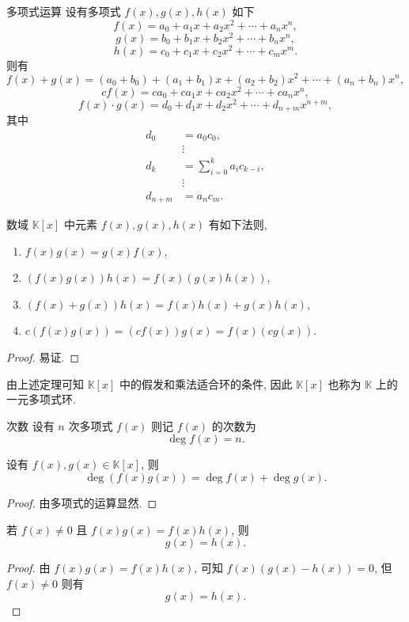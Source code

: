 \documentclass[cn,toc=twocol]{elegantbook}
\newcommand{\ITEMS}{\begin{enumerate}}
\newcommand{\ITEME}{\end{enumerate}}
\newcommand{\K}{\mathbb{K}}
\begin{document}
\begin{definition}{多项式运算}
设有多项式 $f(x),g(x),h(x)$ 如下
\[
f(x) = a_0 + a_1 x + a_2 x^2 + \cdots + a_n x^n,
\]
\[
g(x) = b_0 + b_1 x + b_2 x^2 + \cdots + b_n x^n,
\]
\[
h(x) = c_0 + c_1 x + c_2 x^2 + \cdots + c_m x^m.
\] 
则有
\[
	f(x) + g(x) = (a_0 + b_0) + (a_1 + b_1) x + (a_2 + b_2) x^2 + \cdots + (a_n + b_n) x^n,
\]
\[
	cf(x) = ca_0 + ca_1 x + ca_2 x^2 + \cdots + ca_n x^n,
\]
\[
	f(x) \cdot g(x) = d_0 + d_1 x + d_2 x^2 + \cdots + d_{n + m} x^{n + m},
\]
其中
\[
\begin{aligned}
	d_0 &= a_0 c_0,\\
	& \vdots\\
	d_k &= \sum_{i=0}^k a_i c_{k-i},\\
	& \vdots\\
	d_{n + m} &= a_n c_m.
\end{aligned}
\]

\end{definition}

\begin{theorem}
	数域 $\K[x]$ 中元素 $f(x), g(x), h(x)$ 有如下法则,
	\ITEMS
		\item $f(x) g(x) = g(x) f(x)$,
		\item $(f(x) g(x)) h(x) = f(x)(g(x) h(x))$,
		\item $(f(x) + g(x)) h(x) = f(x) h(x) + g(x) h(x)$,
		\item $c(f(x)g(x)) = (cf(x))g(x) = f(x)(cg(x))$.
	\ITEME
\end{theorem}
\begin{proof}
	易证.
\end{proof}

由上述定理可知 $\K[x]$ 中的假发和乘法适合环的条件, 因此 $\K[x]$ 也称为 $\K$ 上的一元多项式环.

\begin{definition}{次数}
	设有 $n$ 次多项式 $f(x)$ 则记 $f(x)$ 的次数为
	\[
		\deg f(x) = n.
	\]
\end{definition}

\begin{theorem}{}
	设有 $f(x),g(x) \in \K[x]$, 则
	\[
		\deg (f(x) g(x)) = \deg f(x) + \deg g(x).
	\]
\end{theorem}
\begin{proof}
	由多项式的运算显然.
\end{proof}

\begin{corollary}
	若 $f(x) \neq 0$ 且 $f(x)g(x) = f(x)h(x)$, 则
	\[
		g(x) = h(x).
	\]
\end{corollary}
\begin{proof}
	由 $f(x)g(x) = f(x)h(x)$, 可知 $f(x)(g(x) - h(x)) = 0$, 但 $f(x) \neq 0$ 则有
	\[
		g(x) = h(x).
	\]
\end{proof}
\end{document}
